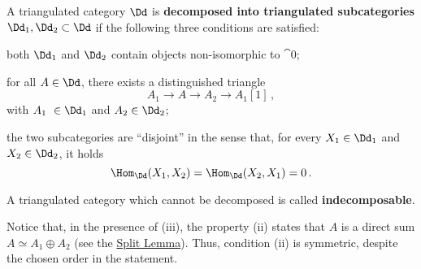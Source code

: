 \begin{df}
    A triangulated category $\Dd$ is \textbf{decomposed into
    triangulated subcategories} $\Dd_{1}, \Dd_{2} \subset \Dd$
    if the following three conditions are satisfied:
    \begin{rmnumerate}
        \item both $\Dd_{1}$ and $\Dd_{2}$ contain objects non-isomorphic
        to $\cat{0}$;

        \item for all $A \in \Dd$, there exists a distinguished triangle
        \begin{equation*}
            A_{1} \longrightarrow A \longrightarrow A_{2} \longrightarrow A_{1}[1]\,,
        \end{equation*}
        with $A_{1} \in \Dd_{1}$ and $A_{2} \in \Dd_{2}$;

        \item the two subcategories are ``disjoint'' in the sense that,
        for every $X_{1} \in \Dd_{1}$ and $X_{2} \in \Dd_{2}$, it holds
        \begin{equation*}
            \Hom_{\Dd}(X_{1}, X_{2}) = \Hom_{\Dd}(X_{2}, X_{1}) = 0\,.
        \end{equation*}
    \end{rmnumerate}
    A triangulated category which cannot be decomposed is called
    \textbf{indecomposable}.
\end{df}

\begin{rmk}
    Notice that, in the presence of (iii), the property (ii) states that
    $A$ is a direct sum $A \simeq A_{1} \oplus A_{2}$ 
    (see the \hyperref[split-lemma]{Split Lemma}).
    Thus, condition (ii) is symmetric, despite the chosen order in the statement.
\end{rmk}

